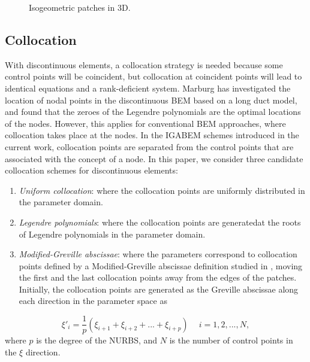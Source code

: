 \documentclass[review]{elsarticle}
\begin{document}
\begin{figure}[!htb]
	\centering
	\hspace{-0.5cm}
	\hspace{2cm}
	\caption{Isogeometric patches in 3D.}\label{interior}
\end{figure}
\label{section:discontinuous}

\subsection{Collocation}
With discontinuous elements, a collocation strategy is needed because some control points will be coincident, but collocation at coincident points will lead to identical equations and a rank-deficient system.  Marburg \cite{Marburg} has investigated the location of nodal points in the discontinuous BEM based on a long duct model, and found that the zeroes of the Legendre polynomials are the optimal locations of the nodes. However, this applies for conventional BEM approaches, where collocation takes place at the nodes. In the IGABEM schemes introduced in the current work, collocation points are separated from the control points that are associated with the concept of a node. In this paper, we consider three candidate collocation schemes for discontinuous elements:

\begin{enumerate}
\item \textit{Uniform collocation}: where the collocation points are uniformly distributed in the parameter domain.
\item \textit{Legendre polynomials}: where the collocation points are generatedat the roots of Legendre polynomials in the parameter domain. 
\item \textit{Modified-Greville abscissae}: where the parameters correspond to collocation points defined by a Modified-Greville abscissae definition studied in \cite{YWang}, moving the first and the last collocation points away from the edges of the patches. Initially, the collocation points are generated as the Greville abscissae along each direction in the parameter space as
\end{enumerate}

\begin{equation}
\xi'_{i} = \frac{1}{p}(\xi_{i+1}+\xi_{i+2}+...+\xi_{i+p}) \quad \: i = 1,2,...,N,
\label{eq:greville}    
\end{equation}
where $p$ is the degree of the NURBS, and $N$ is the number of control points in the $\xi$ direction.
\end{document}
